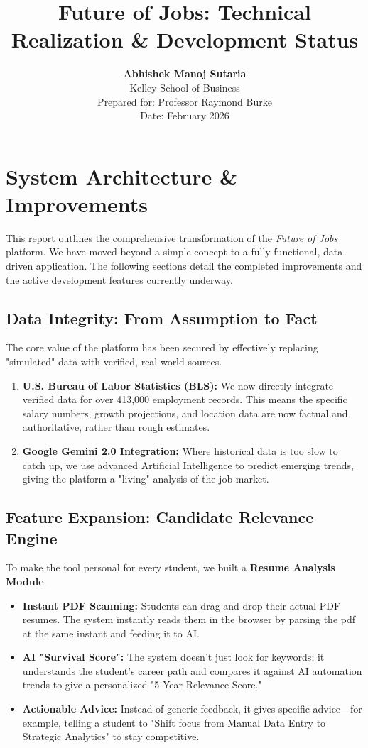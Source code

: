 \documentclass[11pt, letterpaper]{article}
\title{\textbf{\huge Future of Jobs: Technical Realization \& Development Status}}
\author{
    \large \textbf{Abhishek Manoj Sutaria} \\ 
    Kelley School of Business \\[2em] 
    Prepared for: Professor Raymond Burke \\
    Date: February 2026
}
\date{}
\begin{document}
\maketitle
\thispagestyle{empty}

\section{System Architecture \& Improvements}

This report outlines the comprehensive transformation of the \textit{Future of Jobs} platform. We have moved beyond a simple concept to a fully functional, data-driven application. The following sections detail the completed improvements and the active development features currently underway.

\subsection{Data Integrity: From Assumption to Fact}
The core value of the platform has been secured by effectively replacing "simulated" data with verified, real-world sources.
\begin{enumerate}
    \item \textbf{U.S. Bureau of Labor Statistics (BLS):} We now directly integrate verified data for over 413,000 employment records. This means the specific salary numbers, growth projections, and location data are now factual and authoritative, rather than rough estimates.
    \item \textbf{Google Gemini 2.0 Integration:} Where historical data is too slow to catch up, we use advanced Artificial Intelligence to predict emerging trends, giving the platform a "living" analysis of the job market.
\end{enumerate}

\newpage
\subsection{Feature Expansion: Candidate Relevance Engine}
To make the tool personal for every student, we built a \textbf{Resume Analysis Module}.
\begin{itemize}
    \item \textbf{Instant PDF Scanning:} Students can drag and drop their actual PDF resumes. The system instantly reads them in the browser by parsing the pdf at the same instant and feeding it to AI.
    \item \textbf{AI "Survival Score":} The system doesn't just look for keywords; it understands the student's career path and compares it against AI automation trends to give a personalized "5-Year Relevance Score."
    \item \textbf{Actionable Advice:} Instead of generic feedback, it gives specific advice—for example, telling a student to "Shift focus from Manual Data Entry to Strategic Analytics" to stay competitive.
\end{itemize}
\end{document}
